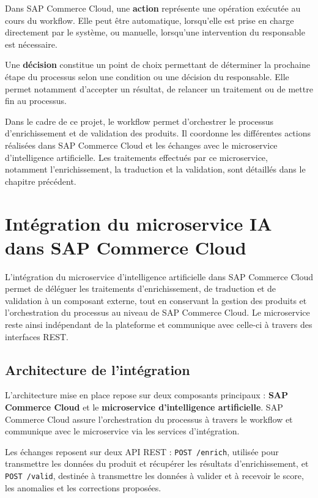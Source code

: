Dans SAP Commerce Cloud, une \textbf{action} représente une opération exécutée au cours du workflow. Elle peut être automatique, lorsqu'elle est prise en charge directement par le système, ou manuelle, lorsqu'une intervention du responsable est nécessaire.

Une \textbf{décision} constitue un point de choix permettant de déterminer la prochaine étape du processus selon une condition ou une décision du responsable. Elle permet notamment d'accepter un résultat, de relancer un traitement ou de mettre fin au processus.

Dans le cadre de ce projet, le workflow permet d'orchestrer le processus d'enrichissement et de validation des produits. Il coordonne les différentes actions réalisées dans SAP Commerce Cloud et les échanges avec le microservice d'intelligence artificielle. Les traitements effectués par ce microservice, notamment l'enrichissement, la traduction et la validation, sont détaillés dans le chapitre précédent.

\section{Intégration du microservice IA dans SAP Commerce Cloud}

L'intégration du microservice d'intelligence artificielle dans SAP Commerce Cloud permet de déléguer les traitements d'enrichissement, de traduction et de validation à un composant externe, tout en conservant la gestion des produits et l'orchestration du processus au niveau de SAP Commerce Cloud. Le microservice reste ainsi indépendant de la plateforme et communique avec celle-ci à travers des interfaces REST.
\newpage
\subsection{Architecture de l'intégration}

L’architecture mise en place repose sur deux composants principaux : \textbf{SAP Commerce Cloud} et le \textbf{microservice d’intelligence artificielle}. SAP Commerce Cloud assure l’orchestration du processus à travers le workflow et communique avec le microservice via les services d’intégration.

Les échanges reposent sur deux API REST : \texttt{POST /enrich}, utilisée pour transmettre les données du produit et récupérer les résultats d’enrichissement, et \texttt{POST /valid}, destinée à transmettre les données à valider et à recevoir le score, les anomalies et les corrections proposées.

